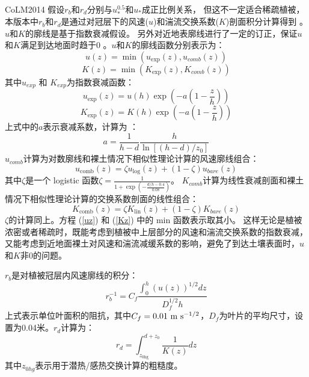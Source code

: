 CoLM2014 假设$r_b$和$r_d$分别与$u_\ast^{0.5}$和$u_\ast$成正比例关系，
但这不一定适合稀疏植被，本版本中$r_b$和$r_d$是通过对冠层下的风速($u$)和湍流交换系数($K$)剖面积分计算得到 \citep{dai2019different}。
$u$和$K$的廓线是基于指数衰减假设\citep{inoue1963turbulent,cowan1968mass}。
另外对近地表廓线进行了一定的订正，保证$u$和$K$满足到达地面时趋于0 \citep{dai2019different}。$u$和$K$的廓线函数分别表示为：
\begin{equation}\label{uz}
u(z)=\min \left(u_{\exp }(z), u_{{comb }}(z)\right)
\end{equation}
\begin{equation}\label{Kz}
K(z)=\min \left(K_{\exp }(z), K_{{comb}}(z)\right)
\end{equation}
其中$u_{exp}$ 和 $K_{exp}$为指数衰减函数：
\begin{equation}
u_{\exp}(z)=u(h) \exp \left(-a\left(1-\frac{z}{h}\right)\right)
\end{equation}
\begin{equation}
K_{\exp}(z)=K(h) \exp \left(-a\left(1-\frac{z}{h}\right)\right)
\end{equation}
上式中的$a$表示衰减系数，计算为 \citep{inoue1963turbulent,cowan1968mass,kondo1971relationship}：
\begin{equation}
a=\frac{1}{h-d} \frac{h}{\ln \left[(h-d) / z_{0}\right]}
\end{equation}
$u_{comb}$计算为对数廓线和裸土情况下相似性理论计算的风速廓线组合：
\begin{equation}\label{ucomb}
u_{\mathrm{comb}}(z)=\zeta u_{\log }(z)+(1-\zeta) u_{{bare }}(z)
\end{equation}
其中$\zeta$是一个 logistic 函数$\zeta=\frac{1}{1+\exp{\left(-\frac{d/h-0.4}{0.08}\right)}}$。
$K_{comb}$计算为线性衰减剖面和裸土情况下相似性理论计算的交换系数剖面的线性组合：
\begin{equation}\label{kcomb}
K_{\mathrm{comb}}(z)=\zeta K_{\mathrm{lin}}(z)+(1-\zeta) K_{{bare }}(z)
\end{equation}
$\zeta$的计算同上。方程 (\ref{uz}) 和 (\ref{Kz}) 中的 min 函数表示取其小。
这样无论是植被浓密或者稀疏时，既能考虑到植被中上层部分的风速和湍流交换系数的指数衰减，
又能考虑到近地面裸土对风速和湍流减缓系数的影响，避免了到达土壤表面时，$u$和$K$非0的问题。


$r_b$是对植被冠层内风速廓线的积分：
\begin{equation}
r_{b}^{-1}=C_{f} \frac{\int_{0}^{h}(u(z))^{1 / 2} d z}{D_{f}^{1 / 2} h}
\end{equation}
上式表示单位叶面积的阻抗，其中$C_f=0.01\ \rm m\ s^{-1/2}$，$D_f$为叶片的平均尺寸，设置为0.04米。$r_d$计算为：
\begin{equation}\label{r_d1}
r_{d}=\int_{z_{0 \mathrm{hg}}}^{d+z_{0}} \frac{1}{K(z)} d z
\end{equation}
其中$z_{0hg}$表示用于潜热/感热交换计算的粗糙度\citep{zeng1998effect}。


